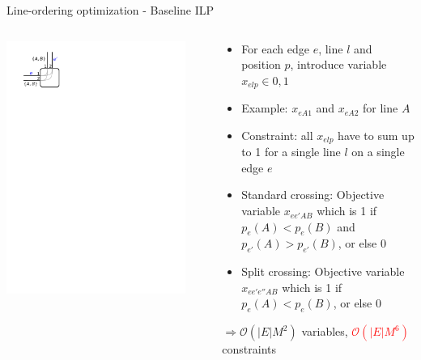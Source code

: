 \documentclass{beamer}
\begin{document}
\begin{frame}{Line-ordering optimization - Baseline ILP}
\begin{columns}[T]
\begin{column}{0.25\textwidth}
			\centering\includegraphics[width=0.9\textwidth, page=2]{figures/crossing.pdf}
		\end{column}
		\begin{column}[T]{0.75\textwidth}			
			\begin{itemize}
				\item For each edge $e$, line $l$ and position $p$, introduce variable $x_{elp} \in {0, 1}$
				\item \alert{Example}: $x_{eA1}$ and $x_{eA2}$ for line $A$
				\item Constraint: all $x_{elp}$ have to sum up to 1 for a single line $l$ on a single edge $e$
				\item \alert{Standard crossing:} Objective variable $x_{ee'AB}$ which is 1 if $p_e(A) < p_{e}(B)$ and $p_{e'}(A) > p_{e'}(B)$, or else 0
				\item \alert{Split crossing:} Objective variable $x_{ee'e''AB}$ which is 1 if $p_e(A) < p_{e}(B)$, or else 0
			\end{itemize}
			\vspace{0.5cm}
			$\Rightarrow \mathcal{O}(|E|M^2)$ variables, \textcolor{red}{$\mathcal{O}(|E|M^6)$} constraints
		\end{column}
	\end{columns}
\end{frame}
\end{document}
